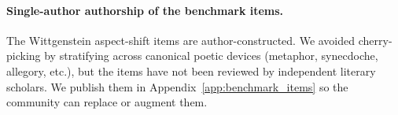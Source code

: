 \paragraph{Single-author authorship of the benchmark items.} The Wittgenstein aspect-shift items are author-constructed. We avoided cherry-picking by stratifying across canonical poetic devices (metaphor, synecdoche, allegory, etc.), but the items have not been reviewed by independent literary scholars. We publish them in Appendix~\ref{app:benchmark_items} so the community can replace or augment them.
